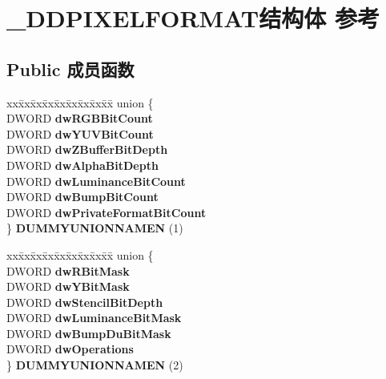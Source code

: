 \hypertarget{struct___d_d_p_i_x_e_l_f_o_r_m_a_t}{}\section{\+\_\+\+D\+D\+P\+I\+X\+E\+L\+F\+O\+R\+M\+A\+T结构体 参考}
\label{struct___d_d_p_i_x_e_l_f_o_r_m_a_t}
\subsection*{Public 成员函数}
\begin{DoxyCompactItemize}
\item 
\mbox{\label{struct___d_d_p_i_x_e_l_f_o_r_m_a_t_aa9d9f98f9882b2b673d10760117ba8e7}} 
\begin{tabbing}
xx\=xx\=xx\=xx\=xx\=xx\=xx\=xx\=xx\=\kill
union \{\\
\>DWORD {\bfseries dwRGBBitCount}\\
\>DWORD {\bfseries dwYUVBitCount}\\
\>DWORD {\bfseries dwZBufferBitDepth}\\
\>DWORD {\bfseries dwAlphaBitDepth}\\
\>DWORD {\bfseries dwLuminanceBitCount}\\
\>DWORD {\bfseries dwBumpBitCount}\\
\>DWORD {\bfseries dwPrivateFormatBitCount}\\
\} {\bfseries DUMMYUNIONNAMEN} (1)\\

\end{tabbing}\item 
\mbox{\label{struct___d_d_p_i_x_e_l_f_o_r_m_a_t_a4fbc71d907598dca6233c22217b7373b}} 
\begin{tabbing}
xx\=xx\=xx\=xx\=xx\=xx\=xx\=xx\=xx\=\kill
union \{\\
\>DWORD {\bfseries dwRBitMask}\\
\>DWORD {\bfseries dwYBitMask}\\
\>DWORD {\bfseries dwStencilBitDepth}\\
\>DWORD {\bfseries dwLuminanceBitMask}\\
\>DWORD {\bfseries dwBumpDuBitMask}\\
\>DWORD {\bfseries dwOperations}\\
\} {\bfseries DUMMYUNIONNAMEN} (2)\\


\end{tabbing}
\end{DoxyCompactItemize}
